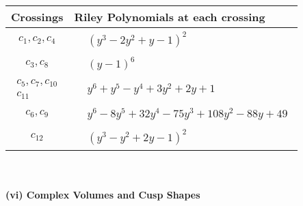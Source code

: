 \documentclass[1p]{elsarticle_modified}
\theoremstyle{definition}
\begin{document}
\begin{tabular}{m{50pt}|m{274pt}}
Crossings & \hspace{64pt}Riley Polynomials at each crossing \\
\hline $$\begin{aligned}c_{1},c_{2},c_{4}\end{aligned}$$&$\begin{aligned}
&(y^3-2 y^2+y-1)^2
\end{aligned}$\\
\hline $$\begin{aligned}c_{3},c_{8}\end{aligned}$$&$\begin{aligned}
&(y-1)^6
\end{aligned}$\\
\hline $$\begin{aligned}c_{5},c_{7},c_{10}\\c_{11}\end{aligned}$$&$\begin{aligned}
&y^6+y^5- y^4+3 y^2+2 y+1
\end{aligned}$\\
\hline $$\begin{aligned}c_{6},c_{9}\end{aligned}$$&$\begin{aligned}
&y^6-8 y^5+32 y^4-75 y^3+108 y^2-88 y+49
\end{aligned}$\\
\hline $$\begin{aligned}c_{12}\end{aligned}$$&$\begin{aligned}
&(y^3- y^2+2 y-1)^2
\end{aligned}$\\
\hline
\end{tabular}\\~\\
\newpage\flushleft \textbf{(vi) Complex Volumes and Cusp Shapes}
\end{document}

